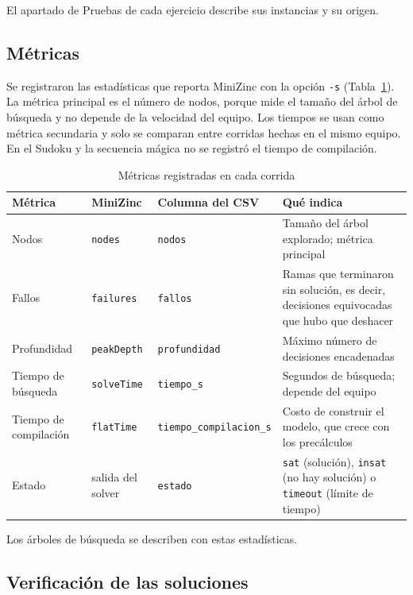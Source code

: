 El apartado de Pruebas de cada ejercicio describe sus instancias y su origen.

\subsection{Métricas}

Se registraron las estadísticas que reporta MiniZinc con la opción \texttt{-s} (Tabla~\ref{tab:metodologia-metricas}). La métrica principal es el número de nodos, porque mide el tamaño del árbol de búsqueda y no depende de la velocidad del equipo. Los tiempos se usan como métrica secundaria y solo se comparan entre corridas hechas en el mismo equipo. En el Sudoku y la secuencia mágica no se registró el tiempo de compilación.

\begin{table}[htbp]
    \caption{Métricas registradas en cada corrida}
    \label{tab:metodologia-metricas}
    \small
    \begin{tabularx}{\textwidth}{@{}>{\raggedright\arraybackslash\hsize=0.6\hsize}Xll>{\raggedright\arraybackslash\hsize=1.4\hsize}X@{}}
        \toprule
        Métrica & MiniZinc & Columna del CSV & Qué indica \\
        \midrule
        Nodos & \texttt{nodes} & \texttt{nodos} & Tamaño del árbol explorado; métrica principal \\
        Fallos & \texttt{failures} & \texttt{fallos} & Ramas que terminaron sin solución, es decir, decisiones equivocadas que hubo que deshacer \\
        Profundidad & \texttt{peakDepth} & \texttt{profundidad} & Máximo número de decisiones encadenadas \\
        Tiempo de búsqueda & \texttt{solveTime} & \texttt{tiempo\_s} & Segundos de búsqueda; depende del equipo \\
        Tiempo de compilación & \texttt{flatTime} & \texttt{tiempo\_compilacion\_s} & Costo de construir el modelo, que crece con los precálculos \\
        Estado & salida del solver & \texttt{estado} & \texttt{sat} (solución), \texttt{insat} (no hay solución) o \texttt{timeout} (límite de tiempo) \\
        \bottomrule
    \end{tabularx}
\end{table}

Los árboles de búsqueda se describen con estas estadísticas.

\subsection{Verificación de las soluciones}

